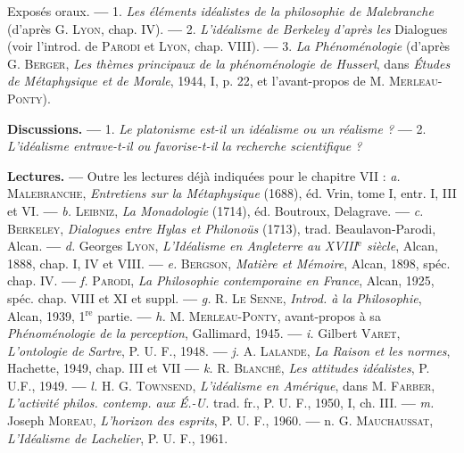 Exposés oraux. {\bf —} 1. {\it Les éléments idéalistes de la philosophie de Malebranche}
(d’après G. \textsc{Lyon}, chap. IV). {\bf —} 2. {\it L'idéalisme de Berkeley d'après
les} Dialogues (voir l'introd. de \textsc{Parodi} et \textsc{Lyon}, chap. VIII). {\bf —} 3. {\it La
Phénoménologie} (d’après G. \textsc{Berger}, {\it Les thèmes principaux de la phénoménologie
de Husserl}, dans {\it Études de Métaphysique et de Morale}, 1944, I,
p. 22, et l’avant-propos de M. \textsc{Merleau-Ponty}).

{\bf Discussions.} {\bf —} 1. {\it Le platonisme est-il un idéalisme ou un réalisme ?} {\bf —}
2. {\it L'idéalisme entrave-t-il ou favorise-t-il la recherche scientifique ?}

{\bf Lectures.} {\bf —} Outre les lectures déjà indiquées pour le chapitre VII :
{\it a.} \textsc{Malebranche}, {\it Entretiens sur la Métaphysique} (1688), éd. Vrin, tome I,
entr. I, III et VI. {\bf —} {\it b.} \textsc{Leibniz}, {\it La Monadologie} (1714), éd. Boutroux,
Delagrave. {\bf —} {\it c.} \textsc{Berkeley}, {\it Dialogues entre Hylas et Philonoüs} (1713),
trad. Beaulavon-Parodi, Alcan. {\bf —} {\it d.} Georges \textsc{Lyon}, {\it L'Idéalisme en
Angleterre au {\footnotesize XVIII}$^\text{e}$ siècle}, Alcan, 1888, chap. I, IV et VIII. {\bf —} {\it e.} \textsc{Bergson},
{\it Matière et Mémoire}, Alcan, 1898, spéc. chap. IV. {\bf —} {\it f.} \textsc{Parodi}, {\it La Philosophie
contemporaine en France}, Alcan, 1925, spéc. chap. VIII et XI et
suppl. {\bf —} {\it g.} R. \textsc{Le Senne}, {\it Introd. à la Philosophie}, Alcan, 1939, 1$^\text{re}$ partie.
{\bf —} {\it h.} M. \textsc{Merleau-Ponty}, avant-propos à sa {\it Phénoménologie de la perception},
Gallimard, 1945. {\bf —} {\it i.} Gilbert \textsc{Varet}, {\it L'ontologie de Sartre}, P. U. F.,
1948. {\bf —} {\it j.} A. \textsc{Lalande}, {\it La Raison et les normes}, Hachette, 1949, chap. III
et VII {\bf —} {\it k.} R. \textsc{Blanché}, {\it Les attitudes idéalistes}, P. U.F., 1949.
{\bf —} {\it l.} H. G. \textsc{Townsend}, {\it L'idéalisme en Amérique}, dans M. \textsc{Farber}, {\it L’activité
philos. contemp. aux É.-U.} trad. fr., P. U. F., 1950, I, ch. III. {\bf —} {\it m.} Joseph
\textsc{Moreau}, {\it L'horizon des esprits}, P. U. F., 1960. {\bf —} n. G. \textsc{Mauchaussat},
{\it L'Idéalisme de Lachelier}, P. U. F., 1961.

